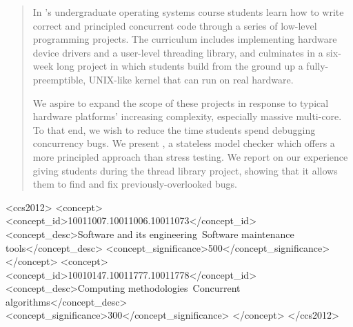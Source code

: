 \documentclass{sig-alternate-05-2015}
\begin{document}
\maketitle
\begin{abstract}

In \carnegiemellon's undergraduate operating systems course
students learn how to write correct and principled concurrent code through
a series of low-level programming projects.
The curriculum includes implementing hardware device drivers and a user-level
threading library, and culminates in a six-week long project in which students
build from the ground up a fully-preemptible, UNIX-like kernel that can run
on real hardware.

We aspire to expand the scope of these projects in response to
typical hardware platforms'
increasing complexity,
especially massive multi-core.
To that end, we wish to reduce the time students spend
debugging concurrency bugs.
We present \landslide, a
stateless model checker which
offers a more principled approach than stress testing.
We report on our experience giving students \landslide during the thread library
project,
showing that it allows them to find and fix previously-overlooked bugs.

\end{abstract}

\begin{CCSXML}
	 <ccs2012>
	 <concept>
	 <concept_id>10011007.10011006.10011073</concept_id>
	 <concept_desc>Software and its engineering~Software maintenance tools</concept_desc>
	 <concept_significance>500</concept_significance>
	 </concept>
	 <concept>
	 <concept_id>10010147.10011777.10011778</concept_id>
	 <concept_desc>Computing methodologies~Concurrent algorithms</concept_desc>
	 <concept_significance>300</concept_significance>
	 </concept>
	 </ccs2012>
\end{CCSXML}
\end{document}
